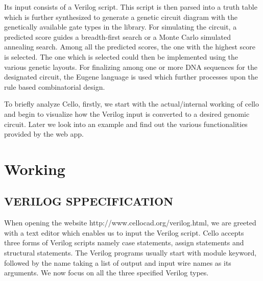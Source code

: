 \documentclass[11pt]{article}
\begin{document}
Its input consists of a Verilog script. This script is then parsed into a truth table which is further synthesized to generate a genetic circuit diagram with the genetically available gate types in the library. For simulating the circuit, a predicted score guides a breadth-first search or a Monte Carlo simulated annealing search. Among all the predicted scores, the one with the highest score is selected. The one which is selected could then be implemented using the various genetic layouts. For finalizing among one or more DNA sequences for the designated circuit, the Eugene language is used which further processes upon the rule based combinatorial design.

To briefly analyze Cello, firstly, we start with the actual/internal working of cello and begin to visualize how the Verilog input is converted to a desired genomic circuit. Later we look into an example and find out the various functionalities provided by the web app.

\section*{Working}
\bigskip
\subsection*{VERILOG SPPECIFICATION}
When opening the website http://www.cellocad.org/verilog.html, we are greeted with a text editor which enables us to input the Verilog script. Cello accepts three forms of Verilog scripts namely case statements, assign statements and structural statements. The Verilog programs usually start with module keyword, followed by the name taking a list of output and input wire names as its arguments. We now focus on all the three specified Verilog types.
\end{document}
